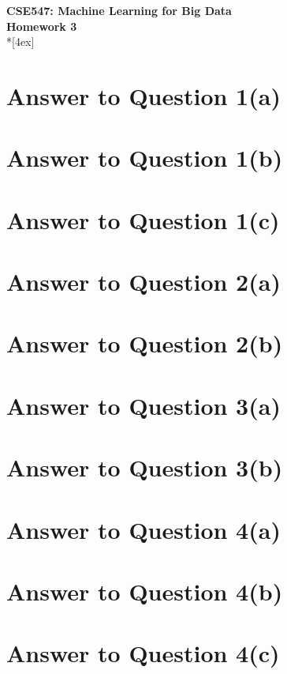 \documentclass[11pt]{article}
\begin{document}
\thispagestyle{empty}
\parindent 0pt
\vfill
\large

\begin{center}
\LARGE{\bf \textsf{CSE547: Machine Learning for Big Data}}\\ {\bf \textsf{Homework 3}} 
\\*[4ex]
\end{center}

\section*{Answer to Question 1(a)}

\pagebreak[4]
\section*{Answer to Question 1(b)}

\pagebreak[4]
\section*{Answer to Question 1(c)}

\pagebreak[4]
\section*{Answer to Question 2(a)}

\pagebreak[4]
\section*{Answer to Question 2(b)}

\pagebreak[4]
\section*{Answer to Question 3(a)}

\pagebreak[4]
\section*{Answer to Question 3(b)}

\pagebreak[4]
\section*{Answer to Question 4(a)}

\pagebreak[4]
\section*{Answer to Question 4(b)}

\pagebreak[4]
\section*{Answer to Question 4(c)}

\pagebreak[4]
\end{document}
